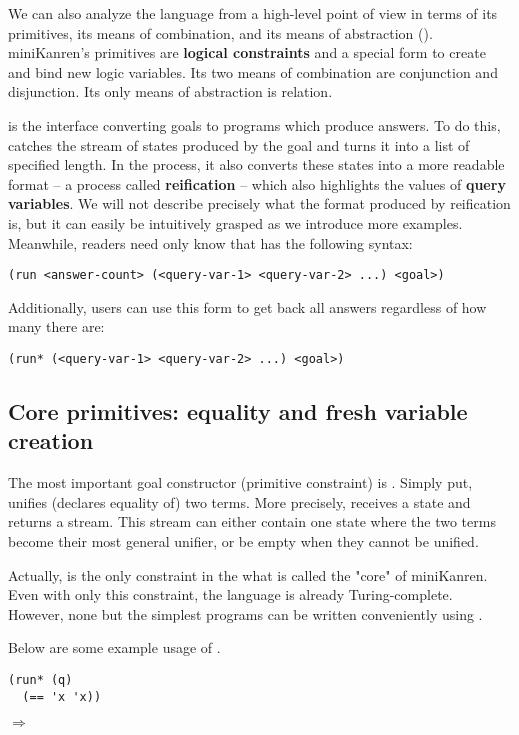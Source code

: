 We can also analyze the language from a high-level point of view in terms of its primitives, its means of combination, and its means of abstraction (\cite[359]{sicp}). miniKanren's primitives are \textbf{logical constraints} and a special form to create and bind new logic variables. Its two means of combination are conjunction and disjunction. Its only means of abstraction is relation.

 is the interface converting goals to programs which produce answers. To do this,  catches the stream of states produced by the goal and turns it into a list of specified length. In the process, it also converts these states into a more readable format -- a process called \textbf{reification} -- which also highlights the values of \textbf{query variables}. We will not describe precisely what the format produced by reification is, but it can easily be intuitively grasped as we introduce more examples. Meanwhile, readers need only know that  has the following syntax:
\begin{lstlisting}
(run <answer-count> (<query-var-1> <query-var-2> ...) <goal>)
\end{lstlisting}

Additionally, users can use this form to get back all answers regardless of how many there are:
\begin{lstlisting}
(run* (<query-var-1> <query-var-2> ...) <goal>)
\end{lstlisting}

\subsection{Core primitives: equality and fresh variable creation}
The most important goal constructor (primitive constraint) is \code{==}.
Simply put, \code{==} unifies (declares equality of) two terms. More precisely, \code{==} receives a state and returns a stream. This stream can either contain one state where the two terms become their most general unifier, or be empty when they cannot be unified.

Actually, \code{==} is the only constraint in the what is called the "core" of miniKanren. Even with only this constraint, the language is already Turing-complete. However, none but the simplest programs can be written conveniently using \code{==}.

Below are some example usage of \code{==}.
\begin{lstlisting}
(run* (q)
  (== 'x 'x))
\end{lstlisting}
$\Rightarrow$ 

